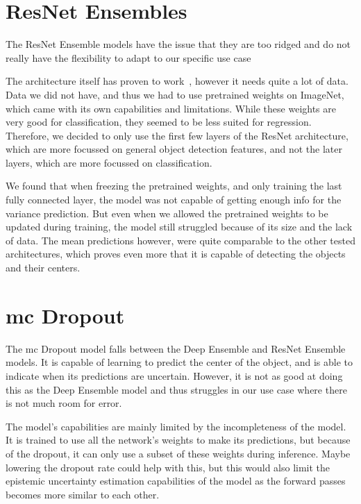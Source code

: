 \section{ResNet Ensembles}
The ResNet Ensemble models have the issue that they are too ridged and do not really have the flexibility to adapt to our specific use case

The architecture itself has proven to work~\cite{src:resnet}, however it needs quite a lot of data.
Data we did not have, and thus we had to use pretrained weights on ImageNet, which came with its own capabilities and limitations.
While these weights are very good for classification, they seemed to be less suited for regression.
Therefore, we decided to only use the first few layers of the ResNet architecture, which are more focussed on general object detection features, and not the later layers, which are more focussed on classification.

We found that when freezing the pretrained weights, and only training the last fully connected layer, the model was not capable of getting enough info for the variance prediction.
But even when we allowed the pretrained weights to be updated during training, the model still struggled because of its size and the lack of data.
The mean predictions however, were quite comparable to the other tested architectures, which proves even more that it is capable of detecting the objects and their centers.

\section{\gls{mc} Dropout}
The \gls{mc} Dropout model falls between the Deep Ensemble and ResNet Ensemble models.
It is capable of learning to predict the center of the object, and is able to indicate when its predictions are uncertain.
However, it is not as good at doing this as the Deep Ensemble model and thus struggles in our use case where there is not much room for error.

The model's capabilities are mainly limited by the incompleteness of the model.
It is trained to use all the network's weights to make its predictions, but because of the dropout, it can only use a subset of these weights during inference.
Maybe lowering the dropout rate could help with this, but this would also limit the epistemic uncertainty estimation capabilities of the model as the forward passes becomes more similar to each other.